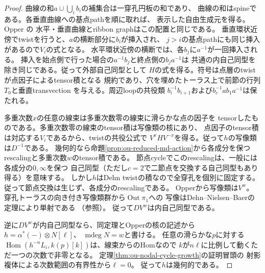 \begin{proof}
曲線の和$a\cup\bigcup_i b_i$の補集合は一穿孔円板の和であり、
曲線の和はspineである。各垂直曲線への基点pathを順に取れば、
表示した自由生成元を得る。Opper
\cite[Example~4.7, Proposition~6.11, Figure~22]{Opper2026}の
水平・垂直曲線とribbon graphはこの配置と同じである。
垂直環状近傍でtwistを行うと、$a$の横断部分に$b_i$が挿入され、
$j>i$の基点pathにも同じ挿入があるので$V_i$の式となる。
水平環状近傍の横断では、各$b_j$に$a^{-1}$が一回挿入される。
挿入を始点側で行った場合の$a^{-1}b_j$と終点側の$b_j a^{-1}$は
共通の内自己同型を除き同じである。従って外部自己同型として
$H$の式を得る。符号は点層のtwistが点因子によるtensor積となる
規約であり、穴を埋めたトーラス上で前節の行列$T_0$と垂直transvection
を与える。周辺loopの共役類
$b_i^{-1}b_{i+1}$および$b_c^{-1}ab_1a^{-1}$は保たれる。

多重次数$x$の任意の線束は多重次数零の線束に滑らかな点の因子を
tensorしたものである。多重次数零の線束のtensor積は写像類の核にあり、
点因子のtensor積は対応する$V_i$であるから、twistの共役公式で
$V^x H V^{-x}$を得る。従って$h$の写像類は$D^{-1}$である。
幾何的なら命題\ref{prop:ou-reduced-md-action}から各成分を保つ
rescalingと多重次数$w$のtensor積である。
節点cycleでこのrescalingは、一般には各成分の$0,\infty$を保つ
自己同型（ただし$c=2$で二節点を交換する自己同型もあり得る）を意味する。
しかし$h$はDehn twistの積なので全穿孔を個別に固定する。
従って節点交換は生じず、各成分のrescalingである。
Opper\cite[Proposition~8.40]{Opper2026}から写像類は$V^w$。
穿孔トーラスの向き付き写像類群から$\operatorname{Out}\pi_1$への
写像はDehn--Nielsen--Baerの定理により単射である
（\cite[Chapter~8]{FarbMargalit2012}参照）。
従って$DV^w$は内自己同型である。

逆に$DV^w$が内自己同型なら、同定理とOpperの核の記述から
$h=\alpha^*(-)\otimes N[\ell]$、
$\operatorname{mdeg}N=w$と書ける。
任意の滑らかな$p$に対する
$\operatorname{Hom}(h^{-n}L_i,k(p)[k])$は、線束からのHomなので
$k$が$n\ell$に比例して動くただ一つの次数で非零となる。
定理\ref{thm:ou-nodal-cycle-growth}の証明冒頭の
射影複体による次数範囲の有界性から$\ell=0$。
従って$h$は幾何的である。
\end{proof}

